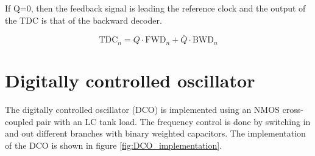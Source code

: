                                                                                                                                                                                                                                                                                                                                                                                                                                                                                                                                                                                                                                                                                                                                                                                                                                                                                                                                                                                                                                                                                                                                                                                                                                                                                                                                                                                                                                                                                                                                                                         If Q=0, then the feedback signal is leading the reference clock and the output of the TDC
is that of the backward decoder. 

\begin{equation}
    \text{TDC}_{n} = Q \cdot \text{FWD}_{n} + \overline{Q} \cdot \text{BWD}_{n}
    \label{eq:MUX_equation}
\end{equation}

\section{Digitally controlled oscillator}
The digitally controlled oscillator (DCO) is implemented using an NMOS cross-coupled pair with an LC tank load. The frequency control is done by switching in and out different branches with binary weighted capacitors.
The implementation of the DCO is shown in figure \ref{fig:DCO_implementation}.

